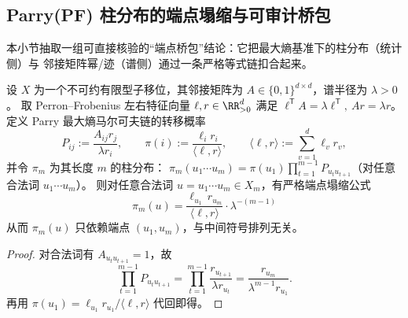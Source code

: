 \subsection{Parry(PF) 柱分布的端点塌缩与可审计桥包}\label{subsec:parry-endpoint-bridge}

本小节抽取一组可直接核验的“端点桥包”结论：它把最大熵基准下的柱分布（统计侧）与
邻接矩阵幂/迹（谱侧）通过一条严格等式链扣合起来。

\begin{theorem}\label{thm:parry-endpoint-collapse}
设 \(X\) 为一个不可约有限型子移位，其邻接矩阵为 \(A\in\{0,1\}^{d\times d}\)，谱半径为 \(\lambda>0\)。
取 Perron--Frobenius 左右特征向量 \(\ell,r\in\RR_{>0}^d\) 满足
\(
\ell^{\mathsf T}A=\lambda \ell^{\mathsf T},\ Ar=\lambda r
\)。
定义 Parry 最大熵马尔可夫链的转移概率
\[
P_{ij}:=\frac{A_{ij}r_j}{\lambda r_i},
\qquad
\pi(i):=\frac{\ell_i r_i}{\langle \ell,r\rangle},
\qquad
\langle \ell,r\rangle:=\sum_{v=1}^d \ell_v r_v,
\]
并令 \(\pi_m\) 为其长度 \(m\) 的柱分布：
\(
\pi_m(u_1\cdots u_m)=\pi(u_1)\prod_{t=1}^{m-1}P_{u_tu_{t+1}}
\)（对任意合法词 \(u_1\cdots u_m\)）。
则对任意合法词 \(u=u_1\cdots u_m\in X_m\)，有严格端点塌缩公式
\[
\boxed{\;
\pi_m(u)=\frac{\ell_{u_1}\,r_{u_m}}{\langle \ell,r\rangle}\cdot \lambda^{-(m-1)}\;}
\]
从而 \(\pi_m(u)\) 只依赖端点 \((u_1,u_m)\)，与中间符号排列无关。
\end{theorem}
\begin{proof}
对合法词有 \(A_{u_tu_{t+1}}=1\)，故
\[
\prod_{t=1}^{m-1}P_{u_tu_{t+1}}
=
\prod_{t=1}^{m-1}\frac{r_{u_{t+1}}}{\lambda r_{u_t}}
=\frac{r_{u_m}}{\lambda^{m-1}r_{u_1}}.
\]
再用 \(\pi(u_1)=\ell_{u_1}r_{u_1}/\langle \ell,r\rangle\) 代回即得。
\end{proof}

